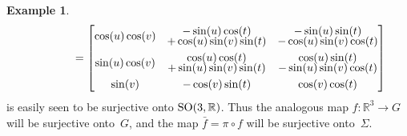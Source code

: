 \documentclass[10pt,a4paper]{amsart}
\numberwithin{equation}{section}
\theoremstyle{definition}
\newtheorem{exmpl}[teo]{Example}
\begin{document}
\begin{exmpl}
\begin{gather*}
\hphantom{f(u,v,t)}{} =
\begin{bmatrix}
\cos(u) \cos(v) & \begin{array}{@{}c@{}} -\sin(u) \cos(t)\vspace{-1mm}\\+ \cos(u) \sin(v) \sin(t)\end{array} & \begin{array}{@{}c@{}} -\sin(u) \sin(t)\vspace{-1mm}\\ - \cos(u) \sin(v) \cos(t)\end{array}
\vspace{1mm}\\
\sin(u) \cos(v) & \begin{array}{@{}c@{}} \cos(u) \cos(t)\vspace{-1mm}\\ + \sin(u) \sin(v) \sin(t)\end{array} & \begin{array}{@{}c@{}} \cos(u) \sin(t)\vspace{-1mm}\\- \sin(u) \sin(v) \cos(t)\end{array}
\vspace{1mm}\\
\sin(v) & -\cos(v) \sin(t) & \cos(v) \cos(t)
\end{bmatrix}
\end{gather*}
is easily seen to be surjective onto ${\rm SO}(3,\mathbb{R})$.
Thus the analogous map $f:\mathbb{R}^3 \to G$ will be surjective onto~$G$, and the map $\bar{f} = \pi \circ f$ will be
surjective onto~$\Sigma$.


\end{exmpl}
\end{document}
